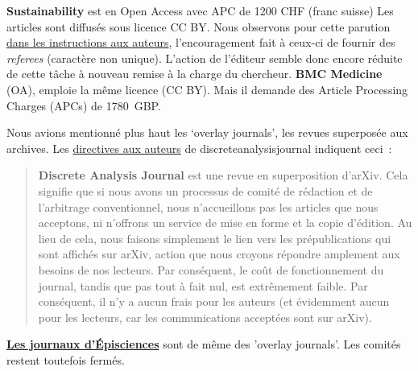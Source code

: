 \textbf{Sustainability} est en Open Access avec APC de 1200 CHF (franc suisse)
Les articles sont diffusés sous licence CC BY.
Nous observons pour cette parution \href{http://www.mdpi.com/journal/sustainability/instructions#referees}{dans les instructions aux auteurs}, l'encouragement fait à ceux-ci de fournir des \textit{referees} (caractère non unique).
L'action de l'éditeur semble donc encore réduite de cette tâche à nouveau remise à la charge du chercheur.
\textbf{BMC Medicine} (OA), emploie la même licence (CC BY).
Mais il demande des Article Processing Charges (APCs) de 1780~GBP.


Nous avions mentionné plus haut les `overlay journals', les revues superposée aux archives.
Les \href{http://discreteanalysisjournal.com/for-authors}{directives aux auteurs} de discreteanalysisjournal indiquent ceci~:
\blockcquote[traduction]{_discrete_????}{
\textbf{Discrete Analysis Journal} est une revue en superposition d'arXiv. Cela signifie que si nous avons un processus de comité de rédaction et de l'arbitrage conventionnel, nous n'accueillons pas les articles que nous acceptons, ni n'offrons un service de mise en forme et la copie d'édition.
Au lieu de cela, nous faisons simplement le lien vers les prépublications qui sont affichés sur arXiv, action que nous croyons répondre amplement aux besoins de nos lecteurs.
Par conséquent, le coût de fonctionnement du journal, tandis que pas tout à fait nul, est extrêmement faible.
Par conséquent, il n'y a aucun frais pour les auteurs (et évidemment aucun pour les lecteurs, car les communications acceptées sont sur arXiv).}
\textbf{\href{http://episciences.org/page/journals}{Les journaux d'Épisciences}} sont de même des 'overlay journals'.
Les comités restent toutefois fermés.

